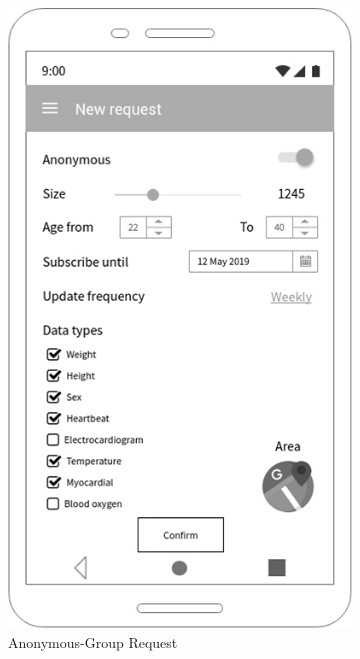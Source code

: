 \begin{figure}[h!]

 \centering

  \begin{subfigure}[b]{0.25\linewidth}

    \includegraphics[width=\linewidth]{img/mockup/tp_areq.jpg}

    \caption{Anonymous-Group Request}

  \end{subfigure}
 ~ ~ ~ ~ ~ ~ 
  \begin{subfigure}[b]{0.25\linewidth}


\end{subfigure}
\end{figure}
